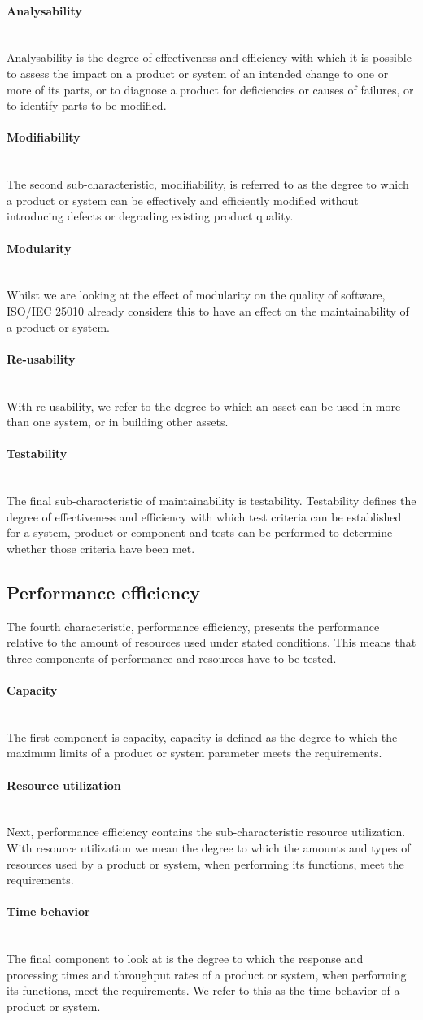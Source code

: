 \documentclass[twoside]{uva-inf-bachelor-thesis}
\newcommand{\myparagraph}[1]{\paragraph{#1}\mbox{}\\}
\begin{document}
\myparagraph{Analysability}
Analysability is the degree of effectiveness and efficiency with which it is possible to assess the impact on a product or system of an intended change to one or more of its parts, or to diagnose a product for deficiencies or causes of failures, or to identify parts to be modified.

\myparagraph{Modifiability}
The second sub-characteristic, modifiability, is referred to as the degree to which a product or system can be effectively and efficiently modified without introducing defects or degrading existing product quality.

\myparagraph{Modularity}
Whilst we are looking at the effect of modularity on the quality of software, ISO/IEC 25010 already considers this to have an effect on the maintainability of a product or system.

\myparagraph{Re-usability}
With re-usability, we refer to the degree to which an asset can be used in more than one system, or in building other assets.

\myparagraph{Testability}
The final sub-characteristic of maintainability is testability. Testability defines the degree of effectiveness and efficiency with which test criteria can be established for a system, product or component and tests can be performed to determine whether those criteria have been met.

\subsection{Performance efficiency}
The fourth characteristic, performance efficiency, presents the performance relative to the amount of resources used under stated conditions. This means that three components of performance and resources have to be tested.

\myparagraph{Capacity}
The first component is capacity, capacity is defined as the degree to which the maximum limits of a product or system parameter meets the requirements.

\myparagraph{Resource utilization}
Next, performance efficiency contains the sub-characteristic resource utilization. With resource utilization we mean the degree to which the amounts and types of resources used by a product or system, when performing its functions, meet the requirements.

\myparagraph{Time behavior}
The final component to look at is the degree to which the response and processing times and throughput rates of a product or system, when performing its functions, meet the requirements. We refer to this as the time behavior of a product or system.
\end{document}
